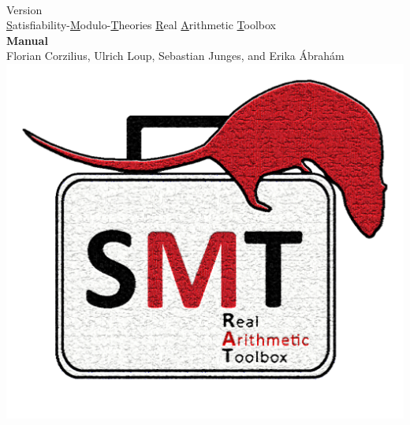\begin{titlepage}
	\begin{center}
		\Huge{\textbf{\TITLE}}\\
		\Huge{Version \VERSION}\vspace{1cm}\\
		\Large \underline{S}atisfiability-\underline{M}odulo-\underline{T}heories \underline{R}eal \underline{A}rithmetic \underline{T}oolbox\vspace{1cm}\\
		\Huge{\textbf{Manual}}\vspace{1cm}\\
		\large{Florian Corzilius, Ulrich Loup, Sebastian Junges, and Erika \'Abrah\'am}\vspace{2cm}\\
		\includegraphics[scale=0.3]{graphics/logo}
	\end{center}
\end{titlepage}
